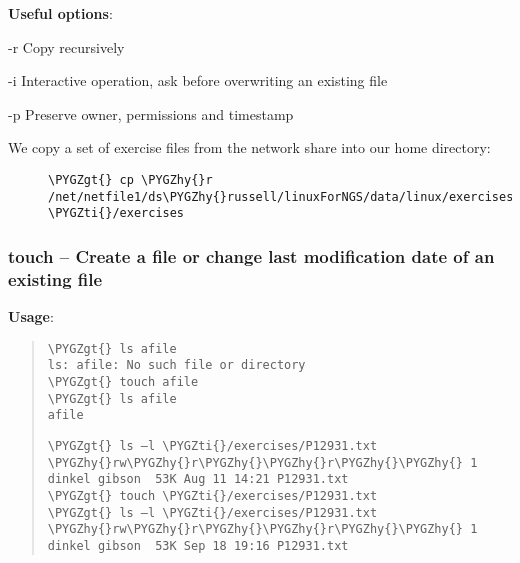 \documentclass[a4paper,11pt,english]{sphinxmanual}
\def\PYGZgt{\char`\>}
\def\PYGZhy{\char`\-}
\def\PYGZti{\char`\~}
\begin{document}
\textbf{Useful options}:
\begin{optionlist}{3cm}
\item [-r]  
Copy recursively
\item [-i]  
Interactive operation, ask before overwriting an existing file
\item [-p]  
Preserve owner, permissions and timestamp
\end{optionlist}
\begin{description}
\item[{We copy a set of exercise files from the network share into our home directory:}] \leavevmode
\begin{Verbatim}[frame=single, rulecolor=\color{lightgray}, fontfamily=courier, commandchars=\\\{\}]
\PYGZgt{} cp \PYGZhy{}r /net/netfile1/ds\PYGZhy{}russell/linuxForNGS/data/linux/exercises  \PYGZti{}/exercises
\end{Verbatim}

\end{description}


\subsubsection{touch – Create a file or change last modification date of an existing file}
\label{introduction:touch-create-a-file-or-change-last-modification-date-of-an-existing-file}
\textbf{Usage}:  
\begin{quote}

\begin{Verbatim}[frame=single, rulecolor=\color{lightgray}, fontfamily=courier, commandchars=\\\{\}]
\PYGZgt{} ls afile
ls: afile: No such file or directory
\PYGZgt{} touch afile
\PYGZgt{} ls afile
afile
\end{Verbatim}

\begin{Verbatim}[frame=single, rulecolor=\color{lightgray}, fontfamily=courier, commandchars=\\\{\}]
\PYGZgt{} ls –l \PYGZti{}/exercises/P12931.txt
\PYGZhy{}rw\PYGZhy{}r\PYGZhy{}\PYGZhy{}r\PYGZhy{}\PYGZhy{} 1 dinkel gibson  53K Aug 11 14:21 P12931.txt
\PYGZgt{} touch \PYGZti{}/exercises/P12931.txt
\PYGZgt{} ls –l \PYGZti{}/exercises/P12931.txt
\PYGZhy{}rw\PYGZhy{}r\PYGZhy{}\PYGZhy{}r\PYGZhy{}\PYGZhy{} 1 dinkel gibson  53K Sep 18 19:16 P12931.txt
\end{Verbatim}
\end{quote}
\end{document}
